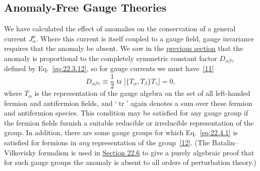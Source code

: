 \subsection{Anomaly-Free Gauge Theories}
\label{sec:22.4}

We have calculated the effect of anomalies on the conservation of a general
current $J_\alpha^\mu$. Where this current is itself coupled to a gauge
field, gauge invariance requires that the anomaly be absent. We saw in the
\hyperref[sec:22.3]{previous section} that the anomaly is proportional to
the completely symmetric constant factor $D_{\alpha\beta\gamma}$ defined
by Eq.~\eqref{eq:22.3.12}, so for gauge currents we must
have~\hyperref[ch22-ref-11]{[11]}
\begin{equation}
 D_{\alpha\beta\gamma}\equiv
 \frac{1}{2}\operatorname{tr}
 \bigl[\{T_\alpha,T_\beta\}T_\gamma\bigr]=0,
 \tag{22.4.1}\label{eq:22.4.1}
\end{equation}
where $T_\alpha$ is the representation of the gauge algebra on the set of
all left-handed fermion and antifermion fields, and `$\operatorname{tr}$'
again denotes a sum over these fermion and antifermion species. This
condition may be satisfied for any gauge group if the fermion fields
furnish a suitable reducible or irreducible representation of the group.
In addition, there are some gauge groups for which Eq.~\eqref{eq:22.4.1}
is satisfied for fermions in \emph{any} representation of the
group~\hyperref[ch22-ref-12]{[12]}. (The Batalin--Vilkovisky formalism is
used in \hyperref[sec:22.6]{Section 22.6} to give a purely algebraic proof
that for such gauge groups the anomaly is absent to all orders of
perturbation theory.)

